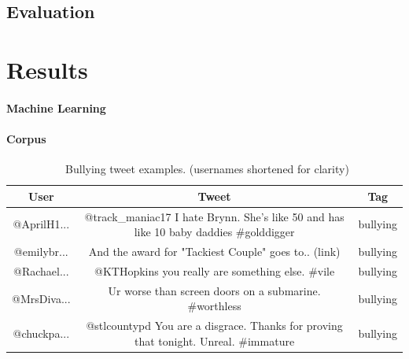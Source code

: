 \documentclass[11pt,letterpaper]{article}
\begin{document}
\subsection{Evaluation}

\section{Results}
\paragraph{Machine Learning}


\paragraph{Corpus}

\begin{table}
\begin{center}
\begin{tabular}{|c|c|c|}
\hline
\bf User & \bf Tweet & \bf Tag\\ 
\hline
@AprilH1... & \multicolumn{1}{p{3.2cm}|}{\raggedright @track\_maniac17 I hate Brynn. She's like 50 and has like 10 baby daddies \#golddigger } & bullying \\
@emilybr...  & \multicolumn{1}{p{3.2cm}|}{\raggedright And the award for "Tackiest Couple" goes to.. (link) } & bullying \\
@Rachael...  & \multicolumn{1}{p{3.2cm}|}{\raggedright  @KTHopkins you really are something else. \#vile } & bullying \\
@MrsDiva...  & \multicolumn{1}{p{3.2cm}|}{\raggedright Ur worse than screen doors on a submarine. \#worthless } & bullying \\
@chuckpa...  & \multicolumn{1}{p{3.2cm}|}{\raggedright @stlcountypd You are a disgrace. Thanks for proving that tonight. Unreal. \#immature } & bullying \\
\hline
\end{tabular}
\end{center}
\caption{\label{corpus-table} ~Bullying tweet examples. (usernames shortened for clarity) }
\end{table}
\end{document}
